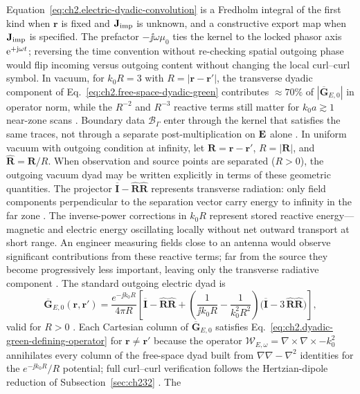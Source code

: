Equation~\eqref{eq:ch2.electric-dyadic-convolution} is a Fredholm integral of the first kind
when \(\mathbf{r}\) is fixed and \(\mathbf{J}_{\mathrm{imp}}\) is unknown, and a constructive export map when
\(\mathbf{J}_{\mathrm{imp}}\) is specified. The prefactor \(-\jj\omega\mu_0\) ties the kernel to the locked
phasor axis \(\mathrm{e}^{+\mathrm{j}\omega t}\); reversing the time convention without re-checking spatial outgoing phase would flip incoming versus
outgoing content without changing the local curl--curl symbol. In vacuum, for \(k_0 R=3\)
with \(R=|\mathbf{r}-\mathbf{r}'|\), the transverse dyadic component of
Eq.~\eqref{eq:ch2.free-space-dyadic-green} contributes \(\approx 70\%\) of
\(|\overline{\mathbf{G}}_{E,0}|\) in operator norm, while the \(R^{-2}\) and \(R^{-3}\)
reactive terms still matter for \(k_0 a\gtrsim 1\) near-zone scans \cite{stratton1941}.
Boundary data \(\mathcal{B}_\Gamma\) enter through the kernel that satisfies the same traces,
not through a separate post-multiplication on \(\mathbf{E}\) alone
\cite{harrington2001}.
In uniform vacuum with outgoing condition at infinity, let
\(\mathbf{R}=\mathbf{r}-\mathbf{r}'\), \(R=|\mathbf{R}|\), and
\(\widehat{\mathbf{R}}=\mathbf{R}/R\).
When observation and source points are separated (\(R>0\)), the outgoing vacuum dyad may
be written explicitly in terms of these geometric quantities. The projector
\(\overline{\mathbf{I}}-\widehat{\mathbf{R}}\widehat{\mathbf{R}}\) represents transverse
radiation: only field components perpendicular to the separation vector carry energy to
infinity in the far zone \cite{stratton1941}. The inverse-power corrections in $k_0 R$
represent stored reactive energy---magnetic and electric energy oscillating locally without
net outward transport at short range. An engineer measuring fields close to an antenna would
observe significant contributions from these reactive terms; far from the source they become
progressively less important, leaving only the transverse radiative component
\cite{harrington2001}.
The standard outgoing electric dyad is
\begin{equation}
\label{eq:ch2.free-space-dyadic-green}
\overline{\mathbf{G}}_{E,0}(\mathbf{r},\mathbf{r}')
=
\frac{e^{-\jj k_0 R}}{4\pi R}
\left[
\overline{\mathbf{I}}
-\widehat{\mathbf{R}}\widehat{\mathbf{R}}
+\left(\frac{1}{\jj k_0 R}-\frac{1}{k_0^{2}R^{2}}\right)
\Big(\overline{\mathbf{I}}-3\,\widehat{\mathbf{R}}\widehat{\mathbf{R}}\Big)
\right],
\end{equation}
valid for \(R>0\) \cite{stratton1941}. Each Cartesian column of $\overline{\mathbf{G}}_{E,0}$ satisfies Eq.~\eqref{eq:ch2.dyadic-green-defining-operator} for $\mathbf{r}\neq\mathbf{r}'$ because the operator $\mathcal{W}_{E,\omega}=\nabla\times\nabla\times-k_0^2$ annihilates every column of the free-space dyad built from $\nabla\nabla-\nabla^{2}$ identities for the $e^{-\jj k_0 R}/R$ potential; full curl--curl verification follows the Hertzian-dipole reduction of Subsection~\ref{sec:ch232} \cite{tai1994,stratton1941}. The
